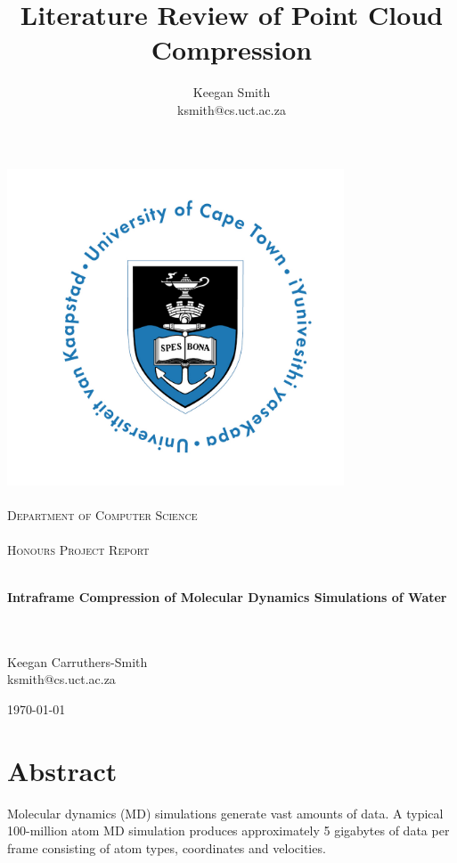 \documentclass{report}
\title{Literature Review of Point Cloud Compression}
\author{Keegan Smith\\ksmith@cs.uct.ac.za}
\begin{document}
\begin{titlepage}
\begin{center}

\includegraphics[width=100mm]{images/uct}\\
\ \\
\textsc{\Large
Department of Computer Science\\
\ \\
Honours Project Report\\
\ \\}

{\huge \bfseries
Intraframe Compression of Molecular Dynamics Simulations of Water
\\}
\ \\
\ \\

\begin{center}
    \large Keegan Carruthers-Smith
    \\
    \small{ksmith@cs.uct.ac.za}
\end{center}

\vfill

{\large \today}

\end{center}
\end{titlepage}


\section*{Abstract}
Molecular dynamics (MD) simulations generate vast amounts of data. A typical
100-million atom MD simulation produces approximately 5 gigabytes of data per
frame consisting of atom types, coordinates and velocities.
\end{document}
